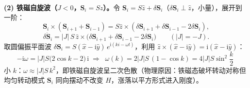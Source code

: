\textbf{(2) 铁磁自旋波（$J<0$，$\pmb S_i=S\hat z$）。}令 $\pmb S_i=S\hat z+\delta\pmb S_i$（$\delta\pmb S_i\perp\hat z$，小量），展开到一阶：
\begin{equation*}
\pmb S_i\times(\pmb S_{i+1}+\pmb S_{i-1})
=S\hat z\times(\delta\pmb S_{i+1}+\delta\pmb S_{i-1}-2\delta\pmb S_i),
\end{equation*}
\begin{equation*}
\delta\dot{\pmb S}_i=|J|\,S\,\hat z\times\big(\delta\pmb S_{i+1}+\delta\pmb S_{i-1}-2\delta\pmb S_i\big)
\qquad(|J|=-J).
\end{equation*}
取圆偏振平面波 $\delta\pmb S_i=S(\hat x-\mathrm{i}\hat y)\,e^{\mathrm{i}(ki-\omega t)}$，利用 $\hat z\times(\hat x-\mathrm{i}\hat y)=\mathrm{i}(\hat x-\mathrm{i}\hat y)$：
\begin{equation*}
-\mathrm{i}\omega=|J|S\big(2\cos k-2\big)\,\mathrm{i}
\;\Longrightarrow\;
\boxed{\;\omega(k)=2|J|S\,(1-\cos k)=4|J|S\sin^2\frac k2\;}
\end{equation*}
小 $k$：$\omega\approx|J|S\,k^2$，即铁磁自旋波呈二次色散（物理原因：铁磁态破坏转动对称但均匀转动模式 $\pmb S_i$ 同向摆动不改变 $H$，涨落以平方形式进入刚度）。

